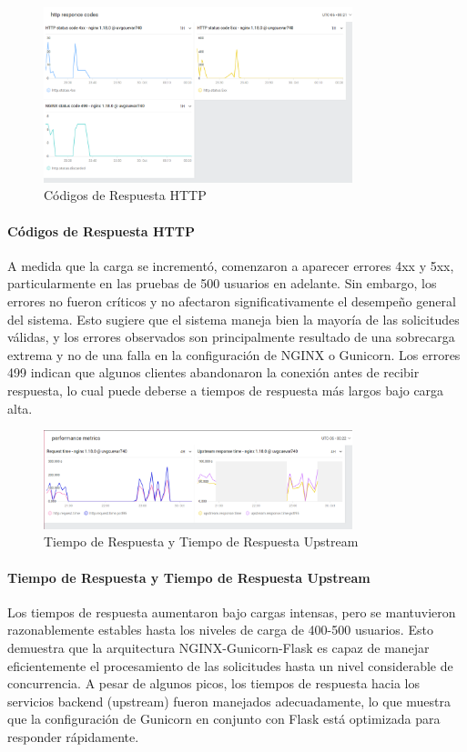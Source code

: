 \begin{figure}[H]
    \centering
    \includegraphics[width=0.8\textwidth]{figuras/HttpResponceCodes.png}
    \caption{Códigos de Respuesta HTTP}
    \label{fig:httpResponceCodes}
\end{figure}

\paragraph{Códigos de Respuesta HTTP}
A medida que la carga se incrementó, comenzaron a aparecer errores 4xx y 5xx, particularmente en las pruebas de 500 usuarios en adelante. Sin embargo, los errores no fueron críticos y no afectaron significativamente el desempeño general del sistema. Esto sugiere que el sistema maneja bien la mayoría de las solicitudes válidas, y los errores observados son principalmente resultado de una sobrecarga extrema y no de una falla en la configuración de NGINX o Gunicorn. Los errores 499 indican que algunos clientes abandonaron la conexión antes de recibir respuesta, lo cual puede deberse a tiempos de respuesta más largos bajo carga alta.

\begin{figure}[H]
    \centering
    \includegraphics[width=0.8\textwidth]{figuras/PerformanceMetrics.png}
    \caption{Tiempo de Respuesta y Tiempo de Respuesta Upstream}
    \label{fig:performanceMetrics}
\end{figure}

\newpage

\paragraph{Tiempo de Respuesta y Tiempo de Respuesta Upstream}
Los tiempos de respuesta aumentaron bajo cargas intensas, pero se mantuvieron razonablemente estables hasta los niveles de carga de 400-500 usuarios. Esto demuestra que la arquitectura NGINX-Gunicorn-Flask es capaz de manejar eficientemente el procesamiento de las solicitudes hasta un nivel considerable de concurrencia. A pesar de algunos picos, los tiempos de respuesta hacia los servicios backend (upstream) fueron manejados adecuadamente, lo que muestra que la configuración de Gunicorn en conjunto con Flask está optimizada para responder rápidamente.

